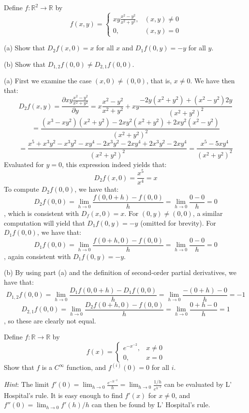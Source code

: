 \begin{exercise}{24}
    Define $f: \mathbb{R}^2 \rightarrow \mathbb{R}$ by
    $$f(x, y) = \begin{cases}
        xy \frac{x^2 - y^2}{x^2 + y^2}, & (x, y) \neq 0 \\
        0, & (x, y) = 0
    \end{cases}$$

    (a) Show that $D_2 f(x, 0) = x$ for all $x$ and $D_1 f(0, y) = -y$ for all $y$.

    (b) Show that $D_{1, 2} f(0, 0) \neq D_{2, 1} f(0, 0)$.
\end{exercise}

\begin{solution}

    (a) First we examine the case $(x, 0) \neq (0, 0)$, that is, $x \neq 0$.
    We have then that:
    $$D_2 f(x, y) = \frac{\partial xy \frac{x^2 - y^2}{x^2 + y^2}}{\partial y}  = x \frac{x^2 - y^2}{x^2 + y^2} + xy \frac{-2y(x^2 + y^2) + (x^2 - y^2)2y}{(x^2 + y^2)^2}$$
    $$= \frac{(x^3 - xy^2)(x^2 + y^2) -2xy^2(x^2 + y^2) + 2xy^2(x^2 - y^2)}{(x^2 + y^2)^2}$$ 
    $$= \frac{x^5 + x^3y^2 - x^3y^2 - xy^4 -2x^3y^2 - 2xy^4 + 2x^3y^2 - 2xy^4}{(x^2 + y^2)^2} = \frac{x^5 - 5xy^4}{(x^2 + y^2)^2}$$
    Evaluated for $y = 0$, this expression indeed yields that:
    $$D_2 f(x, 0) = \frac{x^5}{x^4} = x$$
    To compute $D_2 f(0, 0)$, we have that:
    $$D_2 f(0, 0) = \lim_{h \rightarrow 0} \frac{f(0, 0 + h) - f(0, 0)}{h} = \lim_{h \rightarrow 0} \frac{0 - 0}{h} = 0$$
    , which is consistent with $D_f (x, 0) = x$.
    For $(0, y) \neq (0, 0)$, a similar computation will yield that $D_1 f(0, y) = -y$ (omitted for brevity).
    For $D_1 f(0, 0)$, we have that:
    $$D_1 f(0, 0) = \lim_{h \rightarrow 0} \frac{f(0 + h, 0) - f(0, 0)}{h} = \lim_{h \rightarrow 0} \frac{0 - 0}{h} = 0$$
    , again consistent with $D_1 f(0, y) = -y$.

    (b) By using part (a) and the definition of second-order partial derivatives, we have that:
    $$D_{1, 2} f(0, 0) = \lim_{h \rightarrow 0} \frac{D_1 f(0 , 0 + h) - D_1 f(0, 0)}{h} = \lim_{h \rightarrow 0} \frac{-(0 + h) - 0}{h} = -1$$
    $$D_{2, 1} f(0, 0) = \lim_{h \rightarrow 0} \frac{D_2 f(0 + h, 0) - f(0, 0)}{h} = \lim_{h \rightarrow 0} \frac{0 + h - 0}{h} = 1$$
    , so these are clearly not equal.
\end{solution}

\begin{exercise}{25}
    Define $f: \mathbb{R} \rightarrow \mathbb{R}$ by
    $$f(x) = \begin{cases}
        e^{-x^{-2}}, & x \neq 0 \\
        0, & x = 0
    \end{cases}$$
    Show that $f$ is a $C^{\infty}$ function, and $f^{(i)}(0) = 0$ for all $i$.

    \textit{Hint}: The limit $f'(0) = \lim_{h \rightarrow 0} \frac{e^{-h^{-2}}}{h} = \lim_{h \rightarrow 0} \frac{1/h}{e^{h^{-2}}}$ can be evaluated by L' Hospital's rule.
    It is easy enough to find $f'(x)$ for $x \neq 0$, and $f''(0) = \lim_{h \rightarrow 0} f'(h)/h$ can then be found by L' Hospital's rule.
\end{exercise}

